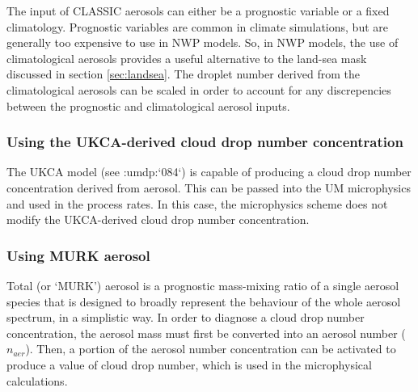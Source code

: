 \documentclass{UMDP_article}
\newcommand{\citeumdp}[1]{:umdp:`#1`}
\begin{document}
The input of CLASSIC aerosols can either be a prognostic variable or a fixed 
climatology. Prognostic variables are common in climate simulations, but
are generally too expensive to use in NWP models. So, in NWP models, the use 
of climatological aerosols provides a useful alternative to the land-sea mask
discussed in section \ref{sec:landsea}. The droplet number derived from the 
climatological aerosols can be scaled in order to account for any discrepencies
between the prognostic and climatological aerosol inputs.

\subsubsection{Using the UKCA-derived cloud drop number concentration}
\label{sec:UKCA_cdnc}
The UKCA model (see \citeumdp{084}) is capable of producing a cloud drop number concentration
derived from aerosol. This can be passed into the UM microphysics and used in the process rates. In this case, the microphysics scheme does not 
modify the UKCA-derived cloud drop number concentration.

\subsubsection{Using MURK aerosol}
\label{sec:murk2nd} 
Total (or `MURK') aerosol is a prognostic mass-mixing ratio of a single aerosol
species that is designed to broadly represent the behaviour of the whole 
aerosol spectrum, in a simplistic way. In order to diagnose a cloud drop number
concentration, the aerosol mass must first be converted into an aerosol number
($n_{aer}$). Then, a portion of the aerosol number concentration can be activated to 
produce a value of cloud drop number, which is used in the microphysical 
calculations. 
\end{document}
